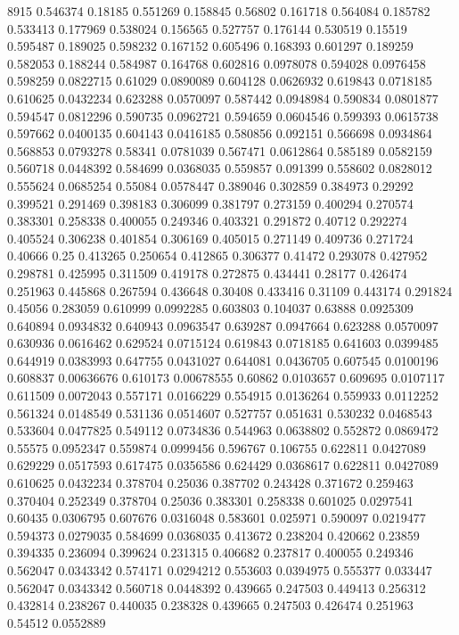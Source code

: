 8915
0.546374 0.18185
0.551269 0.158845
0.56802 0.161718
0.564084 0.185782
0.533413 0.177969
0.538024 0.156565
0.527757 0.176144
0.530519 0.15519
0.595487 0.189025
0.598232 0.167152
0.605496 0.168393
0.601297 0.189259
0.582053 0.188244
0.584987 0.164768
0.602816 0.0978078
0.594028 0.0976458
0.598259 0.0822715
0.61029 0.0890089
0.604128 0.0626932
0.619843 0.0718185
0.610625 0.0432234
0.623288 0.0570097
0.587442 0.0948984
0.590834 0.0801877
0.594547 0.0812296
0.590735 0.0962721
0.594659 0.0604546
0.599393 0.0615738
0.597662 0.0400135
0.604143 0.0416185
0.580856 0.092151
0.566698 0.0934864
0.568853 0.0793278
0.58341 0.0781039
0.567471 0.0612864
0.585189 0.0582159
0.560718 0.0448392
0.584699 0.0368035
0.559857 0.091399
0.558602 0.0828012
0.555624 0.0685254
0.55084 0.0578447
0.389046 0.302859
0.384973 0.29292
0.399521 0.291469
0.398183 0.306099
0.381797 0.273159
0.400294 0.270574
0.383301 0.258338
0.400055 0.249346
0.403321 0.291872
0.40712 0.292274
0.405524 0.306238
0.401854 0.306169
0.405015 0.271149
0.409736 0.271724
0.40666 0.25
0.413265 0.250654
0.412865 0.306377
0.41472 0.293078
0.427952 0.298781
0.425995 0.311509
0.419178 0.272875
0.434441 0.28177
0.426474 0.251963
0.445868 0.267594
0.436648 0.30408
0.433416 0.31109
0.443174 0.291824
0.45056 0.283059
0.610999 0.0992285
0.603803 0.104037
0.63888 0.0925309
0.640894 0.0934832
0.640943 0.0963547
0.639287 0.0947664
0.623288 0.0570097
0.630936 0.0616462
0.629524 0.0715124
0.619843 0.0718185
0.641603 0.0399485
0.644919 0.0383993
0.647755 0.0431027
0.644081 0.0436705
0.607545 0.0100196
0.608837 0.00636676
0.610173 0.00678555
0.60862 0.0103657
0.609695 0.0107117
0.611509 0.0072043
0.557171 0.0166229
0.554915 0.0136264
0.559933 0.0112252
0.561324 0.0148549
0.531136 0.0514607
0.527757 0.051631
0.530232 0.0468543
0.533604 0.0477825
0.549112 0.0734836
0.544963 0.0638802
0.552872 0.0869472
0.55575 0.0952347
0.559874 0.0999456
0.596767 0.106755
0.622811 0.0427089
0.629229 0.0517593
0.617475 0.0356586
0.624429 0.0368617
0.622811 0.0427089
0.610625 0.0432234
0.378704 0.25036
0.387702 0.243428
0.371672 0.259463
0.370404 0.252349
0.378704 0.25036
0.383301 0.258338
0.601025 0.0297541
0.60435 0.0306795
0.607676 0.0316048
0.583601 0.025971
0.590097 0.0219477
0.594373 0.0279035
0.584699 0.0368035
0.413672 0.238204
0.420662 0.23859
0.394335 0.236094
0.399624 0.231315
0.406682 0.237817
0.400055 0.249346
0.562047 0.0343342
0.574171 0.0294212
0.553603 0.0394975
0.555377 0.033447
0.562047 0.0343342
0.560718 0.0448392
0.439665 0.247503
0.449413 0.256312
0.432814 0.238267
0.440035 0.238328
0.439665 0.247503
0.426474 0.251963
0.54512 0.0552889

